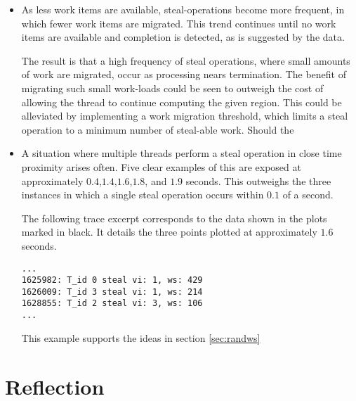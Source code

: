 \begin{itemize}
\item 
    As less work items are available, steal-operations become more frequent, in which fewer work items are migrated. 
    This trend continues until no work items are available and completion is detected, as is suggested by the data.

    The result is that a high frequency of steal operations, where small amounts of work are
    migrated, occur as processing nears termination. The benefit of migrating such small work-loads could
    be seen to outweigh the cost of allowing the thread to continue computing the given region.
    This could be alleviated by implementing a work migration threshold, which limits a steal operation 
    to a minimum number of steal-able work. Should the 

\item 
    A situation where multiple threads perform a steal operation in close time proximity arises often.
    Five clear examples of this are exposed at approximately \(0.4\),\(1.4\),\(1.6\),\(1.8\), and \(1.9\) seconds.
    This outweighs the three instances in which a single steal operation occurs within \(0.1\) of a second.

    The following trace excerpt corresponds to the data shown in the plots marked in black. 
    It details the three points plotted at approximately \(1.6\) seconds.

\begin{lstlisting}
...
1625982: T_id 0 steal vi: 1, ws: 429
1626009: T_id 3 steal vi: 1, ws: 214
1628855: T_id 2 steal vi: 3, ws: 106
...
\end{lstlisting}
    
    This example supports the ideas in section \ref{sec:randws}

\end{itemize}





\section{Reflection}
